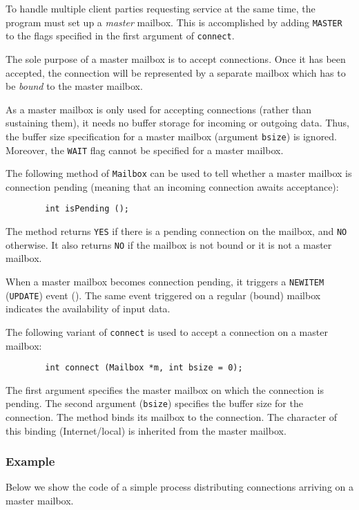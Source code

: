 To handle multiple client parties requesting
service at the same time, the program must set up a {\em master\/} mailbox.
This is accomplished by adding {\tt MASTER} to the flags specified in the
first argument of {\tt connect}.

The sole purpose of a master mailbox is to accept connections.
Once it has been accepted, the connection will be represented by a
separate mailbox which has to be {\em bound\/} to the master mailbox.

As a master mailbox is only used for accepting connections (rather
than sustaining them), it needs no buffer storage for incoming or
outgoing data.
Thus, the buffer size specification for a master mailbox
(argument {\tt bsize}) is ignored.
Moreover, the {\tt WAIT} flag cannot be specified for a master mailbox.

The following method of {\tt Mailbox} can be used to tell whether
a master mailbox is connection pending (meaning that an incoming
connection awaits acceptance):
\begin{verbatim}
        int isPending ();
\end{verbatim}
The method returns {\tt YES} if there is a pending connection on the mailbox,
and {\tt NO} otherwise.
It also returns {\tt NO} if the mailbox is not bound or it is not a
master mailbox.

When a master mailbox becomes connection pending, it triggers a
{\tt NEWITEM} ({\tt UPDATE}) event ().
The same event triggered on a regular (bound) mailbox indicates the
availability of input data.

The following variant of {\tt connect} is used to accept a connection
on a master mailbox:
\begin{verbatim}
        int connect (Mailbox *m, int bsize = 0);
\end{verbatim}
The first argument specifies the master mailbox on which the connection
is pending.
The second argument ({\tt bsize}) specifies the buffer size for the
connection.
The method binds its mailbox to the connection.
The character of this binding (Internet/local) is inherited from the
master mailbox.

\subsubsection*{Example}

\noindent
Below we show the code of a simple process distributing connections arriving
on a master mailbox.

